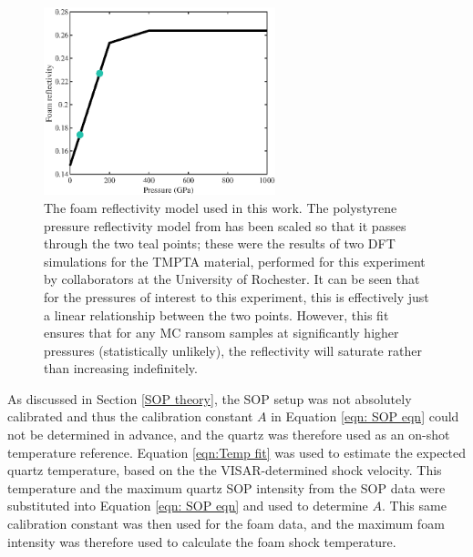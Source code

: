 \begin{figure} [h]
\begin{centering}
\includegraphics[width=0.6\textwidth]{figures/Experiment/FoamReflectivity.eps}%
\caption{\label{fig:Foam Reflectivity} The foam reflectivity model used in this work. The polystyrene pressure reflectivity model from \cite{Hu2014} has been scaled so that it passes through the two teal points; these were the results of two DFT simulations for the TMPTA material, performed for this experiment by collaborators at the University of Rochester. It can be seen that for the pressures of interest to this experiment, this is effectively just a linear relationship between the two points. However, this fit ensures that for any MC ransom samples at significantly higher pressures (statistically unlikely), the reflectivity will saturate rather than increasing indefinitely.}
\end{centering}
\end{figure}

As discussed in Section \ref{SOP theory}, the SOP setup was not absolutely calibrated and thus the calibration constant $A$ in Equation \ref{eqn: SOP eqn} could not be determined in advance, and the quartz was therefore used as an on-shot temperature reference. Equation \ref{eqn:Temp fit} was used to estimate the expected quartz temperature, based on the the VISAR-determined shock velocity. This temperature and the maximum quartz SOP intensity from the SOP data were substituted into Equation \ref{eqn: SOP eqn} and used to determine $A$. This same calibration constant was then used for the foam data, and the maximum foam intensity was therefore used to calculate the foam shock temperature.

